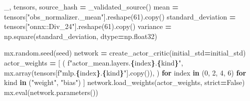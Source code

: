 \documentclass[
  chinese,
  11pt,
  letterpaper,
]{article}
\newenvironment{Shaded}{\begin{snugshade}}{\end{snugshade}}
\newcommand{\BuiltInTok}[1]{#1}
\newcommand{\ControlFlowTok}[1]{\textcolor[rgb]{0.13,0.29,0.53}{\textbf{#1}}}
\newcommand{\DecValTok}[1]{\textcolor[rgb]{0.00,0.00,0.81}{#1}}
\newcommand{\KeywordTok}[1]{\textcolor[rgb]{0.13,0.29,0.53}{\textbf{#1}}}
\newcommand{\NormalTok}[1]{#1}
\newcommand{\OperatorTok}[1]{\textcolor[rgb]{0.81,0.36,0.00}{\textbf{#1}}}
\newcommand{\SpecialCharTok}[1]{\textcolor[rgb]{0.81,0.36,0.00}{\textbf{#1}}}
\newcommand{\SpecialStringTok}[1]{\textcolor[rgb]{0.31,0.60,0.02}{#1}}
\newcommand{\StringTok}[1]{\textcolor[rgb]{0.31,0.60,0.02}{#1}}
\newcommand{\VariableTok}[1]{\textcolor[rgb]{0.00,0.00,0.00}{#1}}
\renewenvironment{Shaded}{\par\smallskip}{\par\smallskip}
\begin{document}
\begin{Shaded}
\begin{Highlighting}[]
\NormalTok{    \_, tensors, source\_hash }\OperatorTok{=}\NormalTok{ \_validated\_source()}
\NormalTok{    mean }\OperatorTok{=}\NormalTok{ tensors[}\StringTok{"obs\_normalizer.\_mean"}\NormalTok{].reshape(}\DecValTok{61}\NormalTok{).copy()}
\NormalTok{    standard\_deviation }\OperatorTok{=}\NormalTok{ tensors[}\StringTok{"onnx::Div\_24"}\NormalTok{].reshape(}\DecValTok{61}\NormalTok{).copy()}
\NormalTok{    variance }\OperatorTok{=}\NormalTok{ np.square(standard\_deviation, dtype}\OperatorTok{=}\NormalTok{np.float32)}

\NormalTok{    mx.random.seed(seed)}
\NormalTok{    network }\OperatorTok{=}\NormalTok{ create\_actor\_critic(initial\_std}\OperatorTok{=}\NormalTok{initial\_std)}
\NormalTok{    actor\_weights }\OperatorTok{=}\NormalTok{ [}
\NormalTok{        (}
            \SpecialStringTok{f"actor\_mean.layers.}\SpecialCharTok{\{}\NormalTok{index}\SpecialCharTok{\}}\SpecialStringTok{.}\SpecialCharTok{\{}\NormalTok{kind}\SpecialCharTok{\}}\SpecialStringTok{"}\NormalTok{,}
\NormalTok{            mx.array(tensors[}\SpecialStringTok{f"mlp.}\SpecialCharTok{\{}\NormalTok{index}\SpecialCharTok{\}}\SpecialStringTok{.}\SpecialCharTok{\{}\NormalTok{kind}\SpecialCharTok{\}}\SpecialStringTok{"}\NormalTok{].copy()),}
\NormalTok{        )}
        \ControlFlowTok{for}\NormalTok{ index }\KeywordTok{in}\NormalTok{ (}\DecValTok{0}\NormalTok{, }\DecValTok{2}\NormalTok{, }\DecValTok{4}\NormalTok{, }\DecValTok{6}\NormalTok{)}
        \ControlFlowTok{for}\NormalTok{ kind }\KeywordTok{in}\NormalTok{ (}\StringTok{"weight"}\NormalTok{, }\StringTok{"bias"}\NormalTok{)}
\NormalTok{    ]}
\NormalTok{    network.load\_weights(actor\_weights, strict}\OperatorTok{=}\VariableTok{False}\NormalTok{)}
\NormalTok{    mx.}\BuiltInTok{eval}\NormalTok{(network.parameters())}


\end{Highlighting}
\end{Shaded}
\end{document}
